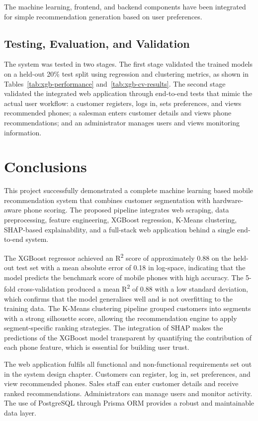 \documentclass[12pt]{report}
\numberwithin{figure}{chapter}
\numberwithin{table}{chapter}
\numberwithin{equation}{chapter}
\begin{document}
The machine learning, frontend, and backend components have been integrated for simple recommendation generation based on user preferences.

\section{Testing, Evaluation, and Validation}

The system was tested in two stages. The first stage validated the trained models on a held-out 20\% test split using regression and clustering metrics, as shown in Tables~\ref{tab:xgb-performance} and~\ref{tab:xgb-cv-results}. The second stage validated the integrated web application through end-to-end tests that mimic the actual user workflow: a customer registers, logs in, sets preferences, and views recommended phones; a salesman enters customer details and views phone recommendations; and an administrator manages users and views monitoring information.

\chapter{Conclusions}
This project successfully demonstrated a complete machine learning based mobile recommendation system that combines customer segmentation with hardware-aware phone scoring. The proposed pipeline integrates web scraping, data preprocessing, feature engineering, XGBoost regression, K-Means clustering, SHAP-based explainability, and a full-stack web application behind a single end-to-end system.

The XGBoost regressor achieved an R\textsuperscript{2} score of approximately 0.88 on the held-out test set with a mean absolute error of 0.18 in log-space, indicating that the model predicts the benchmark score of mobile phones with high accuracy. The 5-fold cross-validation produced a mean R\textsuperscript{2} of 0.88 with a low standard deviation, which confirms that the model generalises well and is not overfitting to the training data. The K-Means clustering pipeline grouped customers into segments with a strong silhouette score, allowing the recommendation engine to apply segment-specific ranking strategies. The integration of SHAP makes the predictions of the XGBoost model transparent by quantifying the contribution of each phone feature, which is essential for building user trust.

The web application fulfils all functional and non-functional requirements set out in the system design chapter. Customers can register, log in, set preferences, and view recommended phones. Sales staff can enter customer details and receive ranked recommendations. Administrators can manage users and monitor activity. The use of PostgreSQL through Prisma ORM provides a robust and maintainable data layer.
\end{document}
